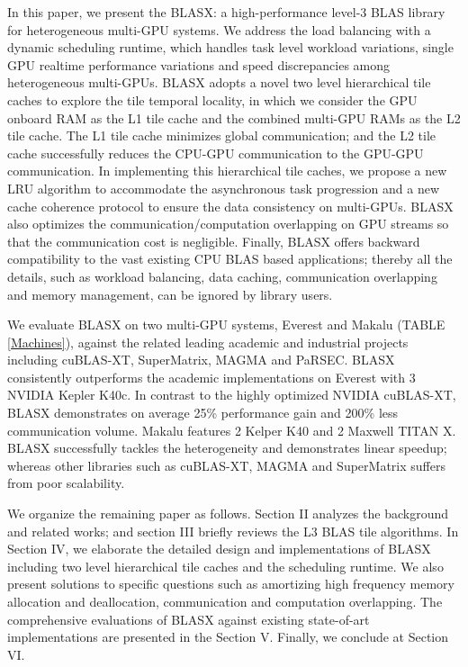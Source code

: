 \documentclass[conference]{IEEEtran}
\begin{document}
In this paper, we present the BLASX: a high-performance level-3 BLAS library for heterogeneous 
multi-GPU systems. We address the load balancing with a dynamic scheduling runtime, which 
handles task level workload variations, single GPU realtime performance variations and speed 
discrepancies among heterogeneous multi-GPUs. BLASX adopts a novel two level hierarchical 
tile caches to explore the tile temporal locality, in which we consider the GPU onboard RAM 
as the L1 tile cache and the combined multi-GPU RAMs as the L2 tile cache. The L1 tile
cache minimizes global communication; and the L2 tile cache successfully reduces 
the CPU-GPU communication to the GPU-GPU communication. In implementing this hierarchical tile 
caches, we propose a new LRU algorithm to accommodate the asynchronous task progression and 
a new cache coherence protocol to ensure the data consistency on multi-GPUs. BLASX also
optimizes the communication/computation overlapping on GPU streams so that the communication
cost is negligible. Finally, BLASX offers backward compatibility to the vast existing CPU BLAS based 
applications; thereby all the details, such as workload balancing, data caching, communication 
overlapping and memory management, can be ignored by library users.

We evaluate BLASX on two multi-GPU systems, Everest and Makalu (TABLE \ref{Machines}), against 
the related leading academic and industrial projects including cuBLAS-XT, SuperMatrix, MAGMA and PaRSEC.
BLASX consistently outperforms the academic implementations on Everest with 3 NVIDIA Kepler 
K40c. In contrast to the highly optimized NVIDIA cuBLAS-XT, BLASX demonstrates on average 
25\% performance gain and 200\% less communication volume. Makalu features 2 Kelper K40 and 2 Maxwell 
TITAN X. BLASX successfully tackles the heterogeneity and demonstrates linear speedup; 
whereas other libraries such as cuBLAS-XT, MAGMA and SuperMatrix suffers from poor scalability.

We organize the remaining paper as follows.
Section II analyzes the background and related works; and section III briefly reviews 
the L3 BLAS tile algorithms. In Section IV, we elaborate the detailed design and implementations 
of BLASX including two level hierarchical tile caches and the scheduling runtime. 
We also present solutions to specific questions such as amortizing high frequency memory allocation 
and deallocation, communication and computation overlapping. The comprehensive evaluations 
of BLASX against existing state-of-art implementations are presented in the Section V. 
Finally, we conclude at Section VI.
\end{document}
